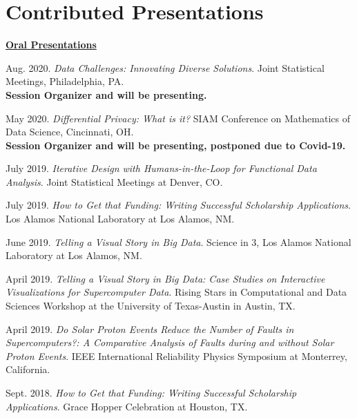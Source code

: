\documentclass[11pt, letterpaper, roman]{moderncv} %
\begin{document}
\vspace{-10pt}
\section{Contributed Presentations}

\underline{\textbf{\large Oral Presentations}}\normalsize
\begin{etaremune}[topsep=0pt, itemsep=5pt, partopsep=0pt, parsep=0pt]
  \item Aug. 2020. \textit{Data Challenges: Innovating Diverse Solutions}. Joint Statistical Meetings, Philadelphia, PA.\\
  \textbf{Session Organizer and will be presenting.}

  \item May 2020. \textit{Differential Privacy: What is it?} SIAM Conference on Mathematics of Data Science, Cincinnati, OH.\\
  \textbf{Session Organizer and will be presenting, postponed due to Covid-19.}
  
  \item July 2019. \textit{Iterative Design with Humans-in-the-Loop for Functional Data Analysis}. Joint Statistical Meetings at Denver, CO. 

  \item July 2019. \textit{How to Get that Funding: Writing Successful Scholarship Applications}. Los Alamos National Laboratory at Los Alamos, NM.

  \item June 2019. \textit{Telling a Visual Story in Big Data}. Science in 3, Los Alamos National Laboratory at Los Alamos, NM. 
  
  \item April 2019. \textit{Telling a Visual Story in Big Data: Case Studies on Interactive Visualizations for Supercomputer Data}. Rising Stars in Computational and Data Sciences Workshop at the University of Texas-Austin in Austin, TX.

  \item April 2019. \textit{Do Solar Proton Events Reduce the Number of Faults in Supercomputers?: A Comparative Analysis of Faults during and without Solar Proton Events}. IEEE International Reliability Physics Symposium at Monterrey, California.
  
  \item Sept. 2018. \textit{How to Get that Funding: Writing Successful Scholarship Applications}. Grace Hopper Celebration at Houston, TX.
  

\end{etaremune}
\end{document}
